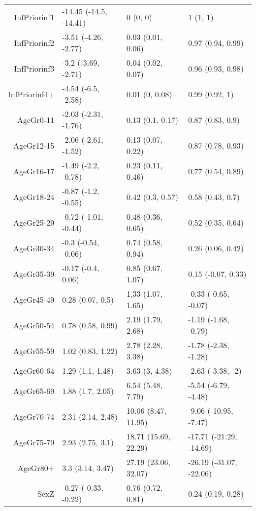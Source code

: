 \begin{table}[ht]
\begin{tabular}{rlll}
  InfPriorinf1 & -14.45 (-14.5, -14.41) & 0 (0, 0) & 1 (1, 1) \\ 
  InfPriorinf2 & -3.51 (-4.26, -2.77) & 0.03 (0.01, 0.06) & 0.97 (0.94, 0.99) \\ 
  InfPriorinf3 & -3.2 (-3.69, -2.71) & 0.04 (0.02, 0.07) & 0.96 (0.93, 0.98) \\ 
  InfPriorinf4+ & -4.54 (-6.5, -2.58) & 0.01 (0, 0.08) & 0.99 (0.92, 1) \\ 
  AgeGr0-11 & -2.03 (-2.31, -1.76) & 0.13 (0.1, 0.17) & 0.87 (0.83, 0.9) \\ 
  AgeGr12-15 & -2.06 (-2.61, -1.52) & 0.13 (0.07, 0.22) & 0.87 (0.78, 0.93) \\ 
  AgeGr16-17 & -1.49 (-2.2, -0.78) & 0.23 (0.11, 0.46) & 0.77 (0.54, 0.89) \\ 
  AgeGr18-24 & -0.87 (-1.2, -0.55) & 0.42 (0.3, 0.57) & 0.58 (0.43, 0.7) \\ 
  AgeGr25-29 & -0.72 (-1.01, -0.44) & 0.48 (0.36, 0.65) & 0.52 (0.35, 0.64) \\ 
  AgeGr30-34 & -0.3 (-0.54, -0.06) & 0.74 (0.58, 0.94) & 0.26 (0.06, 0.42) \\ 
  AgeGr35-39 & -0.17 (-0.4, 0.06) & 0.85 (0.67, 1.07) & 0.15 (-0.07, 0.33) \\ 
  AgeGr45-49 & 0.28 (0.07, 0.5) & 1.33 (1.07, 1.65) & -0.33 (-0.65, -0.07) \\ 
  AgeGr50-54 & 0.78 (0.58, 0.99) & 2.19 (1.79, 2.68) & -1.19 (-1.68, -0.79) \\ 
  AgeGr55-59 & 1.02 (0.83, 1.22) & 2.78 (2.28, 3.38) & -1.78 (-2.38, -1.28) \\ 
  AgeGr60-64 & 1.29 (1.1, 1.48) & 3.63 (3, 4.38) & -2.63 (-3.38, -2) \\ 
  AgeGr65-69 & 1.88 (1.7, 2.05) & 6.54 (5.48, 7.79) & -5.54 (-6.79, -4.48) \\ 
  AgeGr70-74 & 2.31 (2.14, 2.48) & 10.06 (8.47, 11.95) & -9.06 (-10.95, -7.47) \\ 
  AgeGr75-79 & 2.93 (2.75, 3.1) & 18.71 (15.69, 22.29) & -17.71 (-21.29, -14.69) \\ 
  AgeGr80+ & 3.3 (3.14, 3.47) & 27.19 (23.06, 32.07) & -26.19 (-31.07, -22.06) \\ 
  SexZ & -0.27 (-0.33, -0.22) & 0.76 (0.72, 0.81) & 0.24 (0.19, 0.28) \\ 
   \hline
\end{tabular}
\end{table}
